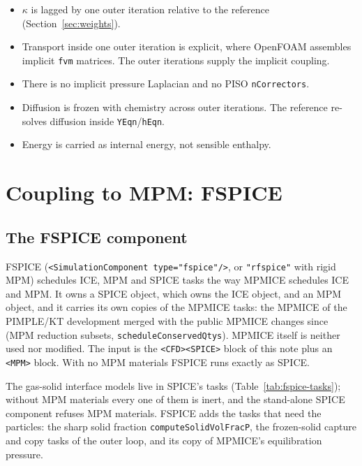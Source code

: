\documentclass[11pt]{article}
\newcommand{\code}[1]{\texttt{\small #1}}
\begin{document}
\begin{deviation}[s, collected]
\begin{itemize}[leftmargin=*]
  \item $\kappa$ is lagged by one outer iteration relative to the reference (Section~\ref{sec:weights}).
  \item Transport inside one outer iteration is explicit, where OpenFOAM assembles implicit
        \code{fvm} matrices. The outer iterations supply the implicit coupling.
  \item There is no implicit pressure Laplacian and no PISO \code{nCorrectors}.
  \item Diffusion is frozen with chemistry across outer iterations. The reference re-solves
        diffusion inside \code{YEqn}/\code{hEqn}.
  \item Energy is carried as internal energy, not sensible enthalpy.
\end{itemize}
\end{deviation}

\clearpage
\section{Coupling to MPM: FSPICE}\label{sec:fspice}

\subsection{The FSPICE component}

FSPICE (\code{<SimulationComponent type="fspice"/>}, or \code{"rfspice"} with rigid MPM)
schedules ICE, MPM and SPICE tasks the way MPMICE schedules ICE and MPM. It owns a SPICE
object, which owns the ICE object, and an MPM object, and it carries its own copies of the
MPMICE tasks: the MPMICE of the PIMPLE/KT development merged with the public MPMICE changes
since (MPM reduction subsets, \code{scheduleConservedQtys}). MPMICE itself is neither used
nor modified. The input is the \code{<CFD><SPICE>} block of this note plus an \code{<MPM>}
block. With no MPM materials FSPICE runs exactly as SPICE.

The gas-solid interface models live in SPICE's tasks (Table~\ref{tab:fspice-tasks}); without
MPM materials every one of them is inert, and the stand-alone SPICE component refuses MPM
materials. FSPICE adds the tasks that need the particles: the sharp solid fraction
\code{computeSolidVolFracP}, the frozen-solid capture and copy tasks of the outer loop, and
its copy of MPMICE's equilibration pressure.
\end{document}
